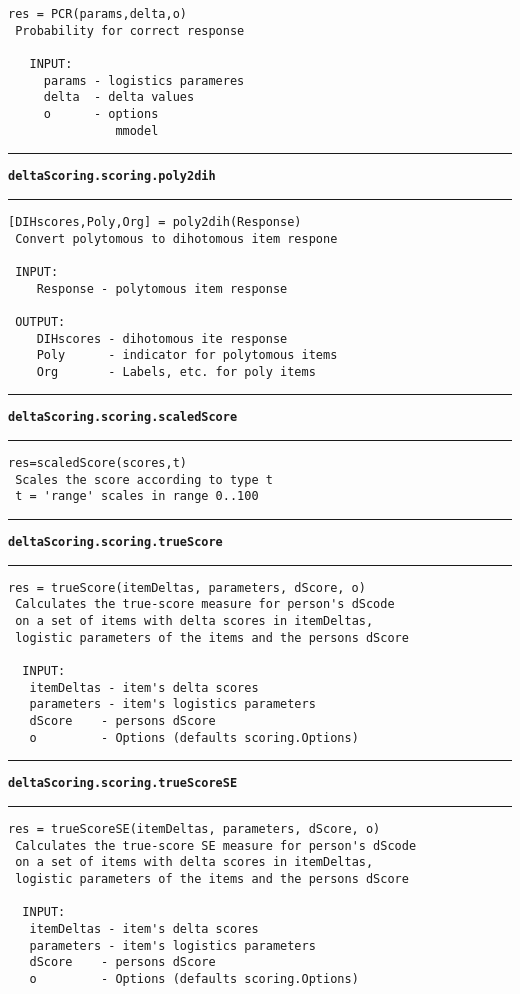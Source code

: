 \begin{lstlisting}[style=Matlab-bw]
 res = PCR(params,delta,o)
 Probability for correct response

   INPUT:
     params - logistics parameres
     delta  - delta values
     o      - options
               mmodel
\end{lstlisting}
\par\noindent\rule{\textwidth}{0.4pt}
{\bf\tt deltaScoring.scoring.poly2dih}
\par\noindent\rule{\textwidth}{0.4pt}
\begin{lstlisting}[style=Matlab-bw]
 [DIHscores,Poly,Org] = poly2dih(Response)
 Convert polytomous to dihotomous item respone

 INPUT:
	Response - polytomous item response

 OUTPUT:
	DIHscores - dihotomous ite response
	Poly      - indicator for polytomous items
	Org       - Labels, etc. for poly items
\end{lstlisting}
\par\noindent\rule{\textwidth}{0.4pt}
{\bf\tt deltaScoring.scoring.scaledScore}
\par\noindent\rule{\textwidth}{0.4pt}
\begin{lstlisting}[style=Matlab-bw]
 res=scaledScore(scores,t)
 Scales the score according to type t
 t = 'range' scales in range 0..100
\end{lstlisting}
\par\noindent\rule{\textwidth}{0.4pt}
{\bf\tt deltaScoring.scoring.trueScore}
\par\noindent\rule{\textwidth}{0.4pt}
\begin{lstlisting}[style=Matlab-bw]
 res = trueScore(itemDeltas, parameters, dScore, o)
 Calculates the true-score measure for person's dScode
 on a set of items with delta scores in itemDeltas,
 logistic parameters of the items and the persons dScore

  INPUT:
   itemDeltas - item's delta scores
   parameters - item's logistics parameters
   dScore    - persons dScore
   o         - Options (defaults scoring.Options)
\end{lstlisting}
\par\noindent\rule{\textwidth}{0.4pt}
{\bf\tt deltaScoring.scoring.trueScoreSE}
\par\noindent\rule{\textwidth}{0.4pt}
\begin{lstlisting}[style=Matlab-bw]
 res = trueScoreSE(itemDeltas, parameters, dScore, o)
 Calculates the true-score SE measure for person's dScode
 on a set of items with delta scores in itemDeltas,
 logistic parameters of the items and the persons dScore

  INPUT:
   itemDeltas - item's delta scores
   parameters - item's logistics parameters
   dScore    - persons dScore
   o         - Options (defaults scoring.Options)
\end{lstlisting}
